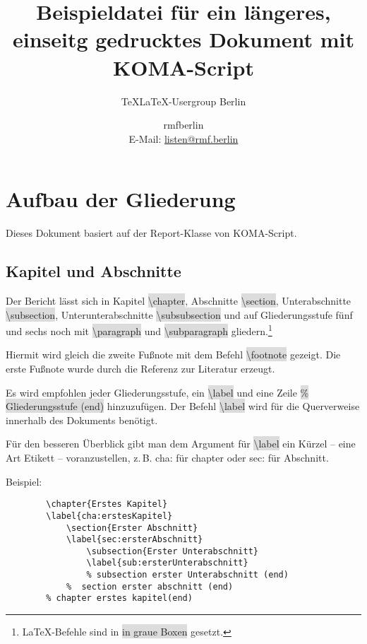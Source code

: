 \documentclass[12pt,	%
				headings=small,		%
				toc=bibliography,	%
			]	%
{scrreprt}		%
\title{Beispieldatei für ein längeres, einseitg gedrucktes Dokument mit KOMA-Script}
\subtitle{TeXLaTeX-Usergroup Berlin}
\author{rmfberlin\\\small{E-Mail: \url{listen@rmf.berlin}}}
\date{\small{\version}}
\newcommand{\inlinecode}[1]{\colorbox{Gainsboro}{\textsf{\textbackslash#1}}} %
\begin{document}
\maketitle
\tableofcontents
\chapter{Aufbau  der Gliederung} %
	\label{cha:aufbauGliederung}
	Dieses Dokument basiert auf der Report-Klasse von KOMA-Script. \autocite{komascript:doku}	%
	\section{Kapitel und Abschnitte}
	\label{sec:KapitelAbschnitte}
			Der Bericht lässt sich in Kapitel \inlinecode{chapter}, Abschnitte \inlinecode{section}, Unterabschnitte \inlinecode{subsection},            \autocite[790]{schlosser} Unterunterabschnitte \inlinecode{subsubsection} und auf Gliederungsstufe fünf und sechs noch mit \inlinecode{paragraph} und \inlinecode{subparagraph} gliedern.\footnote{\LaTeX-Befehle sind in \colorbox{Gainsboro}{in graue Boxen} gesetzt.} 
			
			Hiermit wird gleich die zweite Fußnote mit dem Befehl \inlinecode{footnote} gezeigt. Die erste Fußnote wurde durch die Referenz zur Literatur erzeugt.
			
			Es wird empfohlen jeder Gliederungsstufe, ein  \inlinecode{label} und eine Zeile \colorbox{Gainsboro}{\textsf{\% Gliederungsstufe (end)}} hinzuzufügen. Der Befehl \inlinecode{label} wird für die Querverweise innerhalb des Dokuments benötigt.\autocite[40]{schlosser}
			
			Für den besseren Überblick gibt man dem Argument für \inlinecode{label} ein Kürzel -- eine Art Etikett -- voranzustellen, z.\,B. cha: für chapter oder sec: für Abschnitt.\autocite[71]{schlosser}

	Beispiel:
	
	\begin{lstlisting}
		\chapter{Erstes Kapitel}
		\label{cha:erstesKapitel}
			\section{Erster Abschnitt}
			\label{sec:ersterAbschnitt}
				\subsection{Erster Unterabschnitt}
				\label{sub:ersterUnterabschnitt}
				% subsection erster Unterabschnitt (end)
			%  section erster abschnitt (end)
		% chapter erstes kapitel(end)
	\end{lstlisting}
\end{document}

